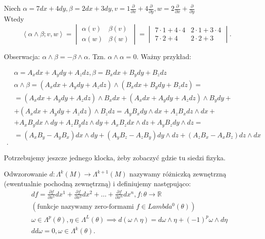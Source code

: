 \documentclass[../main.tex]{subfiles}
\begin{document}
    \begin{przyklad}
        Niech $\alpha = 7dx + 4dy, \beta = 2dx+3dy, v = 1 \frac{\partial }{\partial x} + 4 \frac{\partial }{\partial y} , w = 2 \frac{\partial }{\partial x} + \frac{\partial }{\partial y}$\\
        Wtedy
        \[
            \left<\alpha\land\beta;v,w \right> = \begin{vmatrix}\alpha(v)&\beta(v)\\ \alpha(w)&\beta(w)\end{vmatrix} = \begin{vmatrix}7\cdot 1+4\cdot 4& 2\cdot 1+3\cdot 4 \\ 7\cdot 2+4 & 2\cdot 2+3 \end{vmatrix}
        .\]
    \end{przyklad}
    Obserwacja: $\alpha\land\beta = -\beta\land\alpha$. Tzn. $\alpha\land\alpha = 0$.
    Ważny przykład:
    \begin{przyklad}
        \begin{align*}
            &\alpha = A_xdx + A_ydy + A_zdz, \beta = B_xdx + B_ydy + B_zdz\\
            & \alpha\land\beta = \left( A_xdx + A_ydy + A_zdz \right) \land \left( B_xdx + B_ydy + B_zdz \right) = \\
            &= \left( A_xdx+A_ydy+A_zdz \right) \land B_xdx + \left( A_xdx+A_ydy+A_zdz \right) \land B_ydy + \\
            &+ \left( A_xdx+A_ydy+A_zdz \right) \land B_zdz = A_yB_xdy\land dx + A_zB_x dz\land dx +   \\
            &+ A_xB_y dx\land dy + A_zB_ydz\land dy + A_xB_zdx\land dz + A_yB_zdy\land dz = \\
            &=  \left( A_xB_y - A_yB_x \right) dx\land dy + \left( A_yB_z - A_zB_y \right) dy\land dz + \left( A_zB_x - A_xB_z \right) dz\land dx\\
        .\end{align*}
    \end{przyklad}
    Potrzebujemy jeszcze jednego klocka, żeby zobaczyć gdzie tu siedzi fizyka.
    \begin{definicja}
        Odwzorowanie $d: \Lambda^k(M)\to\Lambda^{k+1}(M)$ nazywamy różniczką zewnętrzną (ewentualnie pochodną zewnętrzną) i definiujemy następująco:
        \begin{align*}
            &df = \frac{\partial f}{\partial x^1} dx^1 + \frac{\partial f}{\partial x^2} dx^2 + \ldots + \frac{\partial f}{\partial x^n} dx^n, f: \theta \to \mathbb{R}\\
            &(\text{funkcje nazywamy zero-formami }f\in Lambda^0(\theta))\\
            &\omega\in\Lambda^p(\theta), \eta\in \Lambda^L(\theta) \implies d(\omega\land\eta) = d\omega\land\eta + (-1)^p\omega\land d\eta \\
            &dd\omega = 0, \omega\in\Lambda^k(\theta)
        .\end{align*}
    \end{definicja}
\end{document}
